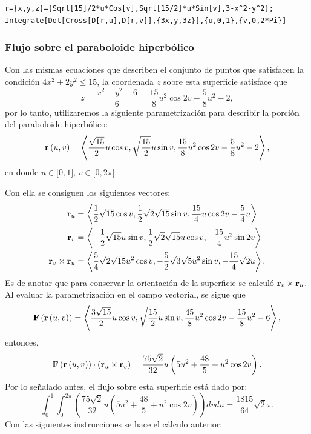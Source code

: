 \begin{parrafonumerado}
\begin{tcolorbox}[title=\bf Instrucción \verb"Mathematica"]\begin{Verbatim}[formatcom=\letraverbatim]
r={x,y,z}={Sqrt[15]/2*u*Cos[v],Sqrt[15/2]*u*Sin[v],3-x^2-y^2};
Integrate[Dot[Cross[D[r,u],D[r,v]],{3x,y,3z}],{u,0,1},{v,0,2*Pi}]
\end{Verbatim}
\end{tcolorbox}

\subsubsection{Flujo sobre el paraboloide hiperbólico}

Con las mismas ecuaciones que describen el conjunto de puntos que satisfacen la condición $4x^{2}+2y^{2} \leq 15$,
la coordenada $z$ sobre esta superficie satisface que
\[z=\frac{x^2-y^2-6}{6}=\frac{15}{8}u^{2}\cos 2v-\frac{5}{8}u^{2}-2,\]
por lo tanto, utilizaremos la siguiente parametrización para describir la porción del paraboloide hiperbólico:
\[{\bf r}\left( u,v\right) =\left\langle \frac{\sqrt{15}}{2}u\cos v,\sqrt{\frac{15}{2}}u\sin v,\frac{15}{8}u^{2}\cos 2v-\frac{5}{8}u^{2}-2\right\rangle,\]
en donde $u\in \lbrack 0,1]$, $v\in \lbrack 0,2\pi ]$.

Con ella se consiguen los siguientes vectores:
\begin{align*}
{\bf r}_{u}&=\left\langle \frac{1}{2}\sqrt{15}\cos v,\frac{1}{2}\sqrt{2}\sqrt{15}\sin v,\frac{15}{4}u\cos 2v-\frac{5}{4}u\right\rangle \\
{\bf r}_{v}&= \left\langle -\frac{1}{2}\sqrt{15}u\sin v,\frac{1}{2}
\sqrt{2}\sqrt{15}u\cos v,-\frac{15}{4}u^{2}\sin 2v \right\rangle \\
{\bf r}_{v}\times {\bf r}_{u}&=\left\langle \frac{5}{4}\sqrt{2}\sqrt{15}u^{2}\cos v,-\frac{5}{2}\sqrt{3}\sqrt{5}u^{2}\sin v,-\frac{15}{4}\sqrt{2}u\right\rangle.
\end{align*}
Es de anotar que para conservar la orientación de la superficie se calculó ${\bf r}_{v}\times {\bf r}_{u}$. Al evaluar la parametrización en el campo vectorial, se sigue que
\[{\bf F}\left( {\bf r}\left( u,v\right) \right) =\left\langle \frac{3\sqrt{15}}{2}u\cos
v,\sqrt{\frac{15}{2}}u\sin v,\frac{45}{8}u^{2}\cos 2v-\frac{15}{8}u^{2}-6\right\rangle,\]
entonces,
\[{\bf F}\left({\bf r}\left( u,v\right) \right) \cdot \left({\bf r}_{u}\times {\bf r}_{v}\right) =
\frac{75\sqrt{2}}{32}u\left( 5u^{2}+\frac{48}{5}+u^{2}\cos 2v\right).\]
Por lo señalado antes, el flujo sobre esta superficie está dado por:
\begin{equation}
\int_{0}^{1}\int_{0}^{2\pi }\left( \frac{75\sqrt{2}}{32}u\left( 5u^{2} + \frac{48}{5}+u^{2}\cos 2v\right) \right) dvdu= \frac{1815}{64}\sqrt{2}\pi. \label{flujo6}
\end{equation}
Con las siguientes instrucciones se hace el cálculo anterior:


\end{parrafonumerado}
